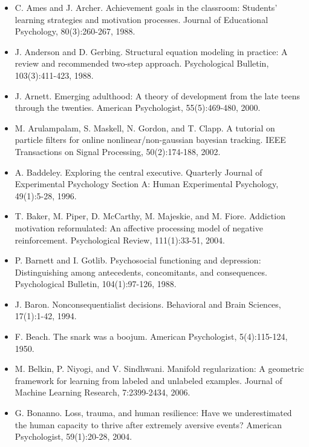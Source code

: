 \documentclass[10pt,letterpaper]{article}
\begin{document}
\begin{itemize}
\item C. Ames and J. Archer. Achievement goals in the classroom: Students' learning strategies and motivation processes. Journal of Educational Psychology, 80(3):260-267, 1988. %
\item J. Anderson and D. Gerbing. Structural equation modeling in practice: A review and recommended two-step approach. Psychological Bulletin, 103(3):411-423, 1988. %
\item J. Arnett. Emerging adulthood: A theory of development from the late teens through the twenties. American Psychologist, 55(5):469-480, 2000. %
\item M. Arulampalam, S. Maskell, N. Gordon, and T. Clapp. A tutorial on particle filters for online nonlinear/non-gaussian bayesian tracking. IEEE Transactions on Signal Processing, 50(2):174-188, 2002. %
\item A. Baddeley. Exploring the central executive. Quarterly Journal of Experimental Psychology Section A: Human Experimental Psychology, 49(1):5-28, 1996. %
\item T. Baker, M. Piper, D. McCarthy, M. Majeskie, and M. Fiore. Addiction motivation reformulated: An affective processing model of negative reinforcement. Psychological Review, 111(1):33-51, 2004. %
\item P. Barnett and I. Gotlib. Psychosocial functioning and depression: Distinguishing among antecedents, concomitants, and consequences. Psychological Bulletin, 104(1):97-126, 1988. %
\item J. Baron. Nonconsequentialist decisions. Behavioral and Brain Sciences, 17(1):1-42, 1994. %
\item F. Beach. The snark was a boojum. American Psychologist, 5(4):115-124, 1950. %
\item M. Belkin, P. Niyogi, and V. Sindhwani. Manifold regularization: A geometric framework for learning from labeled and unlabeled examples. Journal of Machine Learning Research, 7:2399-2434, 2006. %
\item G. Bonanno. Loss, trauma, and human resilience: Have we underestimated the human capacity to thrive after extremely aversive events? American Psychologist, 59(1):20-28, 2004. %

\end{itemize}
\end{document}
